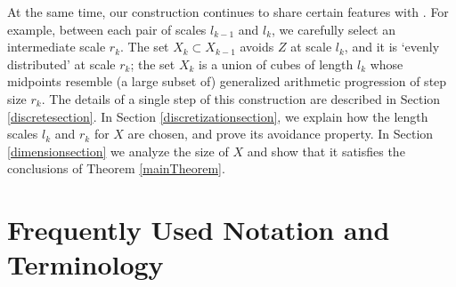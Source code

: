 \documentclass[dvipsnames,letterpaper,12pt]{article}
\numberwithin{equation}{section}
\theoremstyle{plain}
\theoremstyle{remark}
\begin{document}
At the same time, our construction continues to share certain features with \cite{MalabikaRob}. For example, between each pair of scales $l_{k-1}$ and $l_{k}$, we carefully select an intermediate scale $r_k$. The set $X_k \subset X_{k-1}$ avoids $Z$ at scale $l_k$, and it is `evenly distributed' at scale $r_k$; the set $X_k$ is a union of cubes of length $l_k$ whose midpoints resemble (a large subset of) generalized arithmetic progression of step size $r_k$. The details of a single step of this construction are described in Section \ref{discretesection}. In Section \ref{discretizationsection}, we explain how the length scales $l_k$ and $r_k$ for $X$ are chosen, and prove its avoidance property. In Section \ref{dimensionsection} we analyze the size of $X$ and show that it satisfies the conclusions of Theorem \ref{mainTheorem}.





\section{Frequently Used Notation and Terminology}\label{notationSection}
\end{document}
